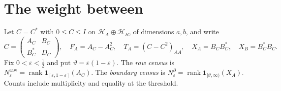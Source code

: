 \documentclass[11pt]{article}
\theoremstyle{definition}
\newcommand{\rank}{\operatorname{rank}}
\begin{document}
\section{The weight between}\label{sec:weight}
Let $C=C^*$ with $0\le C\le I$ on $\mathcal H_A\oplus\mathcal H_B$, of dimensions $a,b$, and write
\[
C=\begin{pmatrix}A_C&B_C\\B_C^*&D_C\end{pmatrix},\quad F_A=A_C-A_C^2,\quad T_A=(C-C^2)_{AA},\quad X_A=B_CB_C^*,\quad X_B=B_C^*B_C.
\]
Fix $0<\varepsilon<\tfrac12$ and put $\vartheta=\varepsilon(1-\varepsilon)$. The \emph{raw census} is $N^{\mathrm{raw}}_\varepsilon=\rank\mathbf 1_{[\varepsilon,1-\varepsilon]}(A_C)$. The \emph{boundary census} is $N^\partial_\varepsilon=\rank\mathbf 1_{[\vartheta,\infty)}(X_A)$. Counts include multiplicity and equality at the threshold.
\end{document}
